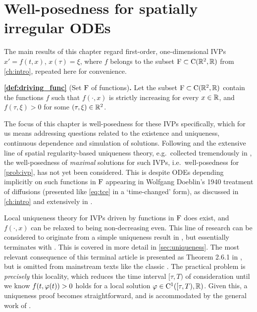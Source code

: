 \clearpage
\section{Well-posedness for spatially irregular ODEs}\label{chap:wellposed}

The main results of this chapter regard first-order, one-dimensional IVPs $x'=f(t,x)$, $x(\tau)=\xi$, where $f$ belongs to the subset $\mathrm{F}\subset\mathrm{C}(\mathbb{R}^2,\mathbb{R})$ from \autoref{ch:intro}, repeated here for convenience.

\textbf{\autoref{def:driving_func}} (Set $\mathrm{F}$ of functions)\textbf{.}
    Let the subset $\mathrm{F}\subset\mathrm{C}(\mathbb{R}^2,\mathbb{R})$ contain the functions $f$ such that $f(\cdot,x)$ is strictly increasing for every $x\in\mathbb{R}$, and $f(\tau,\xi)>0$ for some $(\tau,\xi)\in\mathbb{R}^2$.

The focus of this chapter is well-posedness for these IVPs specifically, which for us means addressing questions related to the existence and uniqueness, continuous dependence and simulation of solutions. Following \cite{lipschitz_1876} and the extensive line of spatial regularity-based uniqueness theory, e.g.~collected tremendously in \cite{agarwal_1993}, the well-posedness of \emph{maximal} solutions for such IVPs, i.e.~well-posedness for \autoref{prob:ivp}, has not yet been considered. This is despite ODEs depending implicitly on such functions in $\mathrm{F}$ appearing in Wolfgang Doeblin's 1940 treatment of diffusions (presented like \autoref{eq:tce} in a `time-changed' form), as discussed in \autoref{ch:intro} and extensively in \cite{bru_2002}.

Local uniqueness theory for IVPs driven by functions in $\mathrm{F}$ does exist, and $f(\cdot,x)$ can be relaxed to being non-decreasing even. This line of research can be considered to originate from a simple uniqueness result in \cite{peano_1890}, but essentially terminates with \cite{wend_1969}. This is covered in more detail in \autoref{sec:uniqueness}. The most relevant consequence of this terminal article is presented as Theorem 2.6.1 in \cite{agarwal_1993}, but is omitted from mainstream texts like the classic \cite{hartman_2002}. The practical problem is \emph{precisely} this locality, which reduces the time interval $[\tau,T)$ of consideration until we know $f(t,\varphi(t))>0$ holds for a local solution $\varphi\in\mathrm{C}^1([\tau,T),\mathbb{R})$. Given this, a uniqueness proof becomes straightforward, and is accommodated by the general work of \cite{cid_2009}.

